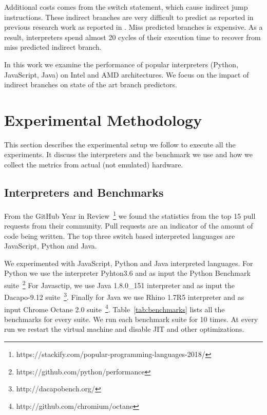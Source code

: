 \documentclass[parskip=full, paper=a4, fontsize=12pt]{scrartcl} %
\numberwithin{equation}{section}
\numberwithin{figure}{section}
\numberwithin{table}{section}
\begin{document}
Additional costs comes from the switch statement, which cause indirect
jump instructions. These indirect branches are very difficult to
predict as reported in previous research work as reported in
\cite{performance_of_interpreters}. Miss predicted branches is
expensive.  As a result, interpreters spend almost 20 cycles of their
execution time to recover from miss predicted indirect branch.

In this work we examine the performance of popular interpreters
(Python, JavaScript, Java) on Intel and AMD architectures. We focus on
the impact of indirect branches on state of the art branch predictors.

\section{Experimental Methodology}
This section describes the experimental setup we follow to execute all
the experiments. It discuss the interpreters and the benchmark we use
and how we collect the metrics from actual (not emulated) hardware.

\subsection{Interpreters and Benchmarks} From the GitHub Year in
Review~\footnote{https://stackify.com/popular-programming-languages-2018/}
we found the statistics from the top 15 pull requests from their
community. Pull requests are an indicator of the amount of code being
written. The top three switch based interpreted languages are
JavaScript, Python and Java.

We experimented with JavaScript, Python and Java interpreted
languages. For Python we use the interpreter Pyhton3.6 and as input
the Python Benchmark
suite~\footnote{https://github.com/python/performance} For Javasctip,
we use Java 1.8.0\_151 interpreter and as input the Dacapo-9.12
suite~\footnote{http://dacapobench.org/}.  Finally for Java we use
Rhino 1.7R5 interpreter and as input Chrome Octane 2.0
suite~\footnote{http://github.com/chromium/octane}.
Table~\ref{tab:benchmarks} lists all the benchmarks for every suite.
We run each benchmark suite for 10 times. At every run we restart the
virtual machine and disable JIT and other optimizations.
\end{document}
